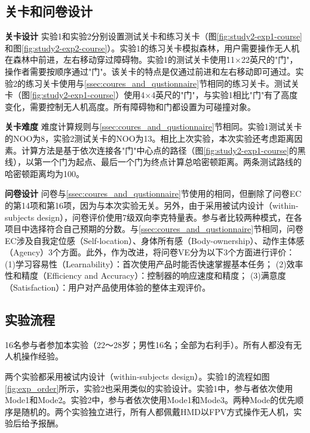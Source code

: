\subsection{关卡和问卷设计}

\textbf{关卡设计}\quad
实验1和实验2分别设置测试关卡和练习关卡（图\ref{fig:study2-exp1-course}和图\ref{fig:study2-exp2-course}）。实验1的练习关卡模拟森林，用户需要操作无人机在森林中前进，左右移动穿过障碍物。实验1的测试关卡使用11$\times$22英尺的"门"，操作者需要按顺序通过"门"。该关卡的特点是仅通过前进和左右移动即可通过。实验2的练习关卡使用与\ref{ssec:coures_and_qustionnaire}节相同的练习关卡。测试关卡（图\ref{fig:study2-exp1-course}）使用4$\times$4英尺的"门"，与实验1相比"门"有了高度变化，需要控制无人机高度。所有障碍物和门都设置为可碰撞对象。

\textbf{关卡难度}\quad
难度计算规则与\ref{ssec:coures_and_qustionnaire}节相同。实验1测试关卡的NOO为8，实验2测试关卡的NOO为13。相比上次实验，本次实验还考虑距离因素。计算方法是基于依次连接各"门"中心点的路径（图\ref{fig:study2-exp1-course}的黑线），以第一个门为起点、最后一个门为终点计算总哈密顿距离。两条测试路线的哈密顿距离均为100。



\textbf{问卷设计}\quad
问卷与\ref{ssec:coures_and_qustionnaire}节使用的相同，但删除了问卷EC的第14项和第16项，因为与本次实验无关。另外，由于采用被试内设计（within-subjects design），问卷评价使用7级双向李克特量表。参与者比较两种模式，在各项目中选择符合自己预期的分数。与\ref{ssec:coures_and_qustionnaire}节相同，问卷EC涉及自我定位感（Self-location）、身体所有感（Body-ownership）、动作主体感（Agency）3个方面。此外，作为改进，将问卷VE分为以下3个方面进行评价\cite{sibarani2021usability}：
(1)学习容易性（Learnability）：首次使用产品时能否快速掌握基本任务；
(2)效率性和精度（Efficiency and Accuracy）：控制器的响应速度和精度；
(3)满意度（Satisfaction）：用户对产品使用体验的整体主观评价。

\subsection{实验流程}

16名参与者参加本实验（22～28岁；男性16名；全部为右利手）。所有人都没有无人机操作经验。

两个实验都采用被试内设计（within-subjects design）。实验1的流程如图\ref{fig:exp_order}所示，实验2也采用类似的实验设计。实验1中，参与者依次使用Mode1和Mode2。实验2中，参与者依次使用Mode1和Mode3。两种Mode的优先顺序是随机的。两个实验独立进行，所有人都佩戴HMD以FPV方式操作无人机，实验后给予报酬。

